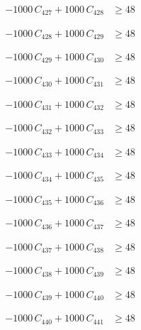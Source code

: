 \documentclass[a4paper,11pt]{article}
\begin{document}
\begin{align}
-1000\,C_{427} + 1000\,C_{428} &\geq 48 \nonumber
\end{align}

\begin{align}
-1000\,C_{428} + 1000\,C_{429} &\geq 48 \nonumber
\end{align}

\begin{align}
-1000\,C_{429} + 1000\,C_{430} &\geq 48 \nonumber
\end{align}

\begin{align}
-1000\,C_{430} + 1000\,C_{431} &\geq 48 \nonumber
\end{align}

\begin{align}
-1000\,C_{431} + 1000\,C_{432} &\geq 48 \nonumber
\end{align}

\begin{align}
-1000\,C_{432} + 1000\,C_{433} &\geq 48 \nonumber
\end{align}

\begin{align}
-1000\,C_{433} + 1000\,C_{434} &\geq 48 \nonumber
\end{align}

\begin{align}
-1000\,C_{434} + 1000\,C_{435} &\geq 48 \nonumber
\end{align}

\begin{align}
-1000\,C_{435} + 1000\,C_{436} &\geq 48 \nonumber
\end{align}

\begin{align}
-1000\,C_{436} + 1000\,C_{437} &\geq 48 \nonumber
\end{align}

\begin{align}
-1000\,C_{437} + 1000\,C_{438} &\geq 48 \nonumber
\end{align}

\begin{align}
-1000\,C_{438} + 1000\,C_{439} &\geq 48 \nonumber
\end{align}

\begin{align}
-1000\,C_{439} + 1000\,C_{440} &\geq 48 \nonumber
\end{align}

\begin{align}
-1000\,C_{440} + 1000\,C_{441} &\geq 48 \nonumber
\end{align}
\end{document}
